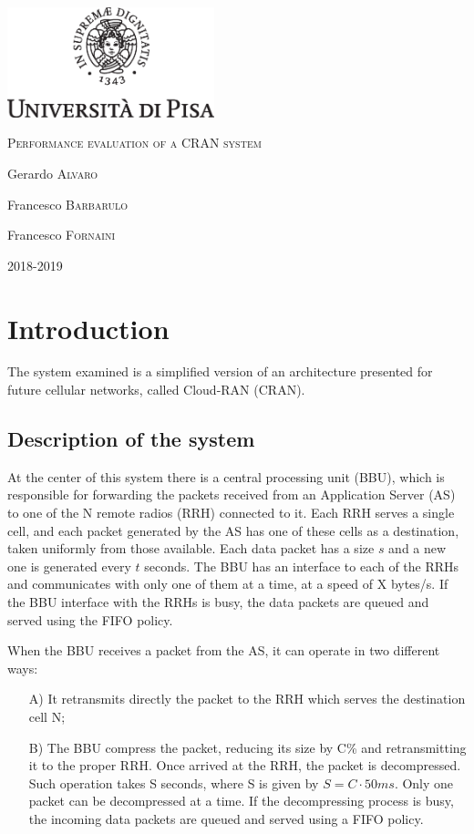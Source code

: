 \documentclass[11pt,a4paper,oneside, openright]{article}
\begin{document}
{
  \begin{titlepage}
  	\centering
  	\includegraphics[width=6cm]{images/unipi.eps}\par
  	\vspace{1.5cm}
  	{\huge\textsc{Performance evaluation of a CRAN system}\par}
  	\vspace{2cm}
  	Gerardo \textsc{Alvaro}\par
  	Francesco \textsc{Barbarulo}\par
    Francesco \textsc{Fornaini}

  	\vfill

  	{\large 2018-2019\par}
  \end{titlepage}
}


\tableofcontents

\newpage

\section{Introduction}
The system examined is a simplified version of an architecture presented for future cellular networks, called Cloud-RAN (CRAN).

\subsection{Description of the system}
 At the center of this system there is a central processing unit (BBU), which is responsible for forwarding the packets received from an Application Server (AS) to one of the N remote radios (RRH) connected to it. Each RRH serves a single cell, and each packet generated by the AS has one of these cells as a destination, taken uniformly from those available. Each data packet has a size $s$ and a new one is generated every $t$ seconds. The BBU has an interface to each of the RRHs and communicates with only one of them at a time, at a speed of X bytes/s. If the BBU interface with the RRHs is busy, the data packets are queued and served using the FIFO policy.

When the BBU receives a packet from the AS, it can operate in two different ways:
\begin{itemize}
	\item[A)]It retransmits directly the packet to the RRH which serves the destination cell N;
	\item[B)]The BBU compress the packet, reducing its size by C\% and retransmitting it to the proper RRH. Once arrived at the RRH, the packet is decompressed. Such operation takes S seconds, where S is given by $ S = C \cdot 50ms $. Only one packet can be decompressed at a time. If the decompressing process is busy, the incoming data packets are queued and served using a FIFO policy.
\end{itemize}
\end{document}
